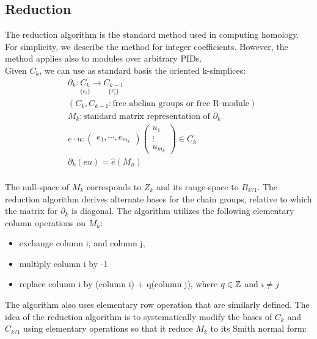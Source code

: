 \documentclass[11pt,a4paper]{report}
\begin{document}
              \subsection{Reduction}

              The reduction algorithm is the standard method used in computing homology. For simplicity,
              we describe the method for integer coefficients. However, the method applies also to modules over arbitrary PIDs. \\

              Given $C_k$, we can use as standard basis the oriented k-simplices:
              \begin{align*}
                &\partial_k: \underset{\{e_i\}}{C_k} \rightarrow \underset{\{\hat{e_i}\}}{C_{k-1}}\\
                &(C_{k}, C_{k-1}: \textrm{free abelian groups or free R-module})\\
                & M_k: \textrm{standard matrix representation of } \partial_k\\
                &e \cdot u: {\begin{pmatrix}e_1, \cdots, e_{m_k}\end{pmatrix}}{\begin{pmatrix}u_1\\\vdots\\u_{m_k}\end{pmatrix}} \in C_k\\
                &\partial_k(eu) = \hat{e}(M_u)\\
              \end{align*}

               The null-space of $M_k$ corresponds to $Z_k$ and its range-space to
                $B_{k?1}$. The reduction algorithm derives alternate bases for the
                chain groups, relative to which the matrix for $\partial_k$ is diagonal. The algorithm utilizes the following elementary column operations on $M_k$:

                \begin{itemize}
                 \item exchange column i, and column j,
                 \item multiply column i by -1
                 \item replace column i by (column i) + q(column j), where $q \in \mathbb{Z}$ and $i \ne j$
                \end{itemize}

                The algorithm also uses elementary row operation that are similarly defined. The idea of the reduction algorithm is to systematically modify the bases of $C_k$ and $C_{k?1}$ using elementary operations so that it reduce $M_k$ to its Smith normal form:
\end{document}
